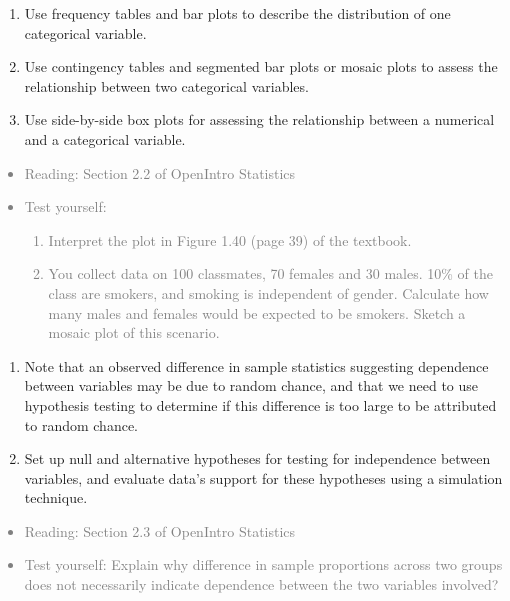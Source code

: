 \documentclass[11pt]{article}
\newcommand{\gray}[1]{\textcolor{gray}{#1}}
\begin{document}
%

\begin{enumerate}[resume]
\renewcommand\labelenumi{\textcolor{light}{\textbf{LO \theenumi.}}}
\item Use frequency tables and bar plots to describe the distribution of one categorical variable.
\item Use contingency tables and segmented bar plots or mosaic plots to assess the relationship between two categorical variables.
\item Use side-by-side box plots for assessing the relationship between a numerical and a categorical variable.
\end{enumerate}

\gray{
{\it
\vspace{-0.75cm}
\begin{itemize}
\renewcommand{\labelitemi}{{\textcolor{dark}{$\ast$}}}
\item Reading: Section 2.2 of OpenIntro Statistics
\item Test yourself: 
\begin{enumerate}
\item Interpret the plot in Figure 1.40 (page 39) of the textbook.
\item You collect data on 100 classmates, 70 females and 30 males. 10\% of the class are smokers, and smoking is independent of gender. Calculate how many males and females would be expected to be smokers. Sketch a mosaic plot of this scenario. \\
\end{enumerate}
\end{itemize}
}}

%

\vspace{0.5cm}

%

\begin{enumerate}[resume]
\renewcommand\labelenumi{\textcolor{light}{\textbf{LO \theenumi.}}}
\item Note that an observed difference in sample statistics suggesting dependence between variables may be due to random chance, and that we need to use hypothesis testing to determine if this difference is too large to be attributed to random chance.
\item Set up null and alternative hypotheses for testing for independence between variables, and evaluate data's support for these hypotheses using a simulation technique.
\end{enumerate}

\gray{
{\it
\vspace{-0.75cm}
\begin{itemize}
\renewcommand{\labelitemi}{{\textcolor{dark}{$\ast$}}}
\item Reading: Section 2.3 of OpenIntro Statistics
\item Test yourself: Explain why difference in sample proportions across two groups does not necessarily indicate dependence between the two variables involved?
\end{itemize}
}}
\end{document}
